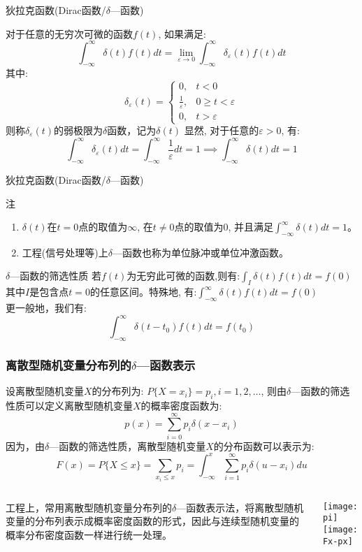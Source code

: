 \begin{frame}{狄拉克函数(Dirac函数/$\delta$---函数)}
\begin{definition}[$\delta$---函数]
	对于任意的无穷次可微的函数$f(t)$, 如果满足:
	$$\int_{-\infty}^{\infty}\delta (t)f(t)dt=\lim\limits_{\varepsilon\to 0}\int_{-\infty}^{\infty}\delta_{\varepsilon}(t)f(t)dt $$
	其中:
	\[
	\delta_{\varepsilon}(t)=\begin{cases}
	0,&t<0\\
	\frac{1}{\varepsilon}, & 0\ge t<\varepsilon\\
	0, &t>\varepsilon
	\end{cases}
	\]
	则称$\delta_\varepsilon(t)$的弱极限为$\delta$函数，记为$\delta(t)$
	显然, 对于任意的$\varepsilon>0$, 有:
	$$\int_{-\infty}^{\infty}\delta_{\varepsilon}(t)dt=\int_{-\infty}^\infty\frac{1}{\varepsilon}dt=1\implies \int_{-\infty}^\infty\delta(t)dt=1$$
\end{definition}
\end{frame}

\begin{frame}{狄拉克函数(Dirac函数/$\delta$---函数)}
\begin{block}{注}
	\begin{enumerate}
		\item $\delta(t)$在$t=0$点的取值为$\infty$, 在$t\ne 0$点的取值为0, 并且满足$\int_{-\infty}^{\infty}\delta(t)dt=1$。
		\item 工程(信号处理等)上$\delta$---函数也称为单位脉冲或单位冲激函数。
	\end{enumerate}
\end{block}
\begin{block}{$\delta$---函数的筛选性质}
	若$f(t)$为无穷此可微的函数,则有:$\int_{I}\delta(t)f(t)dt=f(0) $\\
	其中$I$是包含点$t=0$的任意区间。特殊地, 有:$\int_{-\infty}^{\infty}\delta(t)f(t)dt=f(0) $\\
	更一般地，我们有:
	$$\int_{-\infty}^{\infty}\delta(t-t_0)f(t)dt=f(t_0) $$
\end{block}
\end{frame}

\begin{frame}[shrink]
\frametitle{离散型随机变量分布列的$\delta$---函数表示}
设离散型随机变量$X$的分布列为: $P\{X=x_i\}=p_i,i=1,2,\dots$, 则由$\delta$---函数的筛选性质可以定义离散型随机变量$X$的概率密度函数为:
$$p(x)=\sum\limits_{i=0}^{\infty}p_i\delta(x-x_i)$$
因为，由$\delta$---函数的筛选性质，离散型随机变量$X$的分布函数可以表示为:
$$F(x)=P\{X\le x\}=\sum\limits_{x_i\le x}p_i=\int_{-\infty}^{x}\sum\limits_{i=1}^{\infty}p_i\delta(u-x_i)du$$
\begin{columns}
	\begin{block}{}
		工程上，常用离散型随机变量分布列的$\delta$---函数表示法，将离散型随机变量的分布列表示成概率密度函数的形式，因此与连续型随机变量的概率分布密度函数一样进行统一处理。
	\end{block}
	\texttt{[image: pi]}\\
	\texttt{[image: Fx-px]}
\end{columns}
\end{frame}

